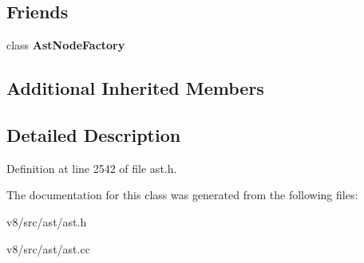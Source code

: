 \subsection*{Friends}
\begin{DoxyCompactItemize}
\item 
\mbox{\label{classv8_1_1internal_1_1ClassLiteralProperty_a8d587c8ad3515ff6433eb83c578e795f}} 
class {\bfseries Ast\+Node\+Factory}
\end{DoxyCompactItemize}
\subsection*{Additional Inherited Members}


\subsection{Detailed Description}


Definition at line 2542 of file ast.\+h.



The documentation for this class was generated from the following files\+:\begin{DoxyCompactItemize}
\item 
v8/src/ast/ast.\+h\item 
v8/src/ast/ast.\+cc\end{DoxyCompactItemize}
